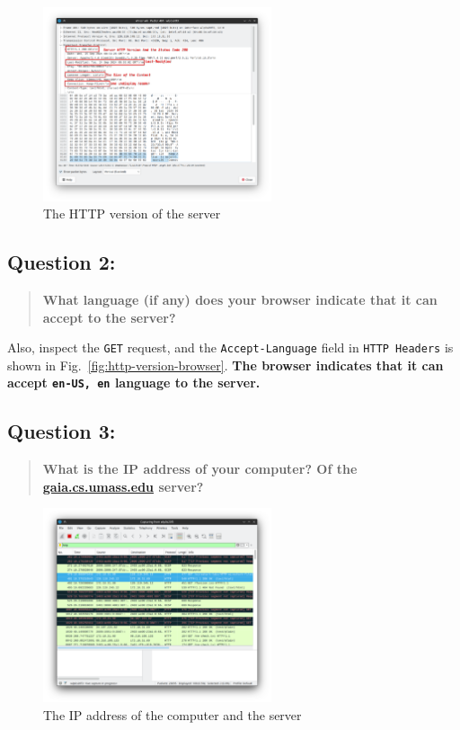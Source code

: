 \documentclass{cshwk}
\begin{document}
\begin{figure}[htbp]
    \centering
    \includegraphics[width=0.6\textwidth]{lab2-2.png}
    \caption{The HTTP version of the server}
    \label{fig:http-version-server}
\end{figure}

\subsection*{Question 2:}

\begin{quote}
    \textbf{What language (if any) does your browser indicate that it can accept to the server?}
\end{quote}

Also, inspect the \texttt{GET} request, and the \texttt{Accept-Language} field in \texttt{HTTP Headers} is shown in Fig.~\ref{fig:http-version-browser}. \textbf{The browser indicates that it can accept \texttt{en-US, en} language to the server.}


\subsection*{Question 3:}

\begin{quote}
    \textbf{What is the IP address of your computer? Of the \href{http://gaia.cs.umass.edu}{gaia.cs.umass.edu} server?}
\end{quote}

\begin{figure}[htbp]
    \centering
    \includegraphics[width=0.6\textwidth]{lab2-3.png}
    \caption{The IP address of the computer and the server}
    \label{fig:ip-address}
\end{figure}
\end{document}
